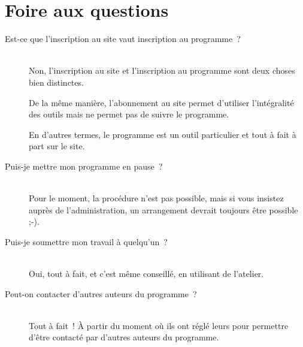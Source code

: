 % 
% 
% 
% 
% 
% 
% 
% 

\section{Foire aux questions}\hypertarget{faq}{}\label{faq}

\begin{description}
\item[Est-ce que l'inscription au site vaut inscription au programme~{}?] \hfill \\
 Non, l'inscription au site \boa{} et l'inscription au programme \unan{} sont deux choses bien distinctes.



De la même manière, l'abonnement au site permet d'utiliser l'intégralité des outils mais ne permet pas de suivre le programme.



En d'autres termes, le programme \unan{} est un outil particulier et tout à fait à part sur le site.



\item[Puis-je mettre mon programme en pause~{}?] \hfill \\
 Pour le moment, la procédure n'est pas possible, mais si vous insistez auprès de l'administration, un arrangement devrait toujours être possible ;-).



\item[Puis-je soumettre mon travail à quelqu'un~{}?] \hfill \\
 Oui, tout à fait, et c'est même conseillé, en utilisant \leForum{} de l'atelier.



\item[Peut-on contacter d'autres auteurs du programme~{}?] \hfill \\
 Tout à fait~{}! À partir du moment où ils ont réglé leurs \preferences{} pour permettre d'être contacté par d'autres auteurs du programme.
\end{description}

